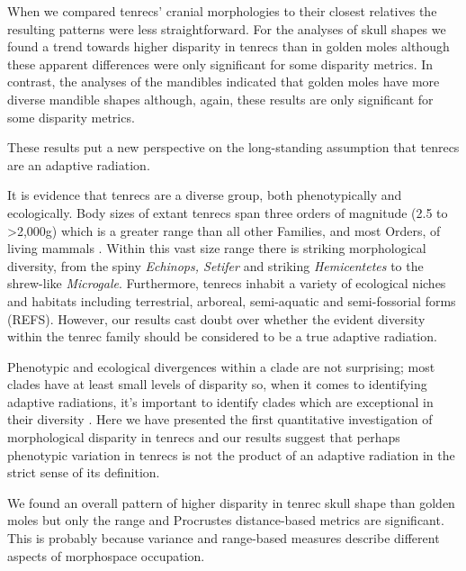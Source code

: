 \documentclass[12pt,a4paper]{article}
\begin{document}
When we compared tenrecs' cranial morphologies to their closest relatives the resulting patterns were less straightforward. For the analyses of skull shapes we found a trend towards higher disparity in tenrecs than in golden moles although these apparent differences were only significant for some disparity metrics. In contrast, the analyses of the mandibles indicated that golden moles have more diverse mandible shapes although, again, these results are only significant for some disparity metrics. %

These results put a new perspective on the long-standing assumption that tenrecs are an adaptive radiation.


It is evidence that tenrecs are a diverse group, both phenotypically and ecologically. Body sizes of extant tenrecs span three orders of magnitude (2.5 to \textgreater 2,000g) which is a greater range than all other Families, and most Orders, of living mammals \citep{Olson2003}. Within this vast size range there is striking morphological diversity, from the spiny \textit{Echinops, Setifer} and striking \textit{Hemicentetes} to the shrew-like  \textit{Microgale}. Furthermore, tenrecs inhabit a variety of ecological niches and habitats including terrestrial, arboreal, semi-aquatic and semi-fossorial forms (REFS). However, our results cast doubt over whether the evident diversity within the tenrec family should be considered to be a true adaptive radiation.

Phenotypic and ecological divergences within a clade are not surprising; most clades have at least small levels of disparity so, when it comes to identifying adaptive radiations, it's important to identify clades which are exceptional in their diversity \citep{Losos2010a}. Here we have presented the first quantitative investigation of morphological disparity in tenrecs and our results suggest that perhaps phenotypic variation in tenrecs is not the product of an adaptive radiation in the strict sense of its definition.





We found an overall pattern of higher disparity in tenrec skull shape than golden moles but only the range and Procrustes distance-based metrics are significant. This is probably because variance and range-based measures describe different aspects of morphospace occupation. 
\end{document}
